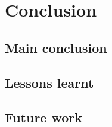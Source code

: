 

\chapter{Conclusion}

\label{Chapter5} %


\section{Main conclusion}


\section{Lessons learnt}


\section{Future work}